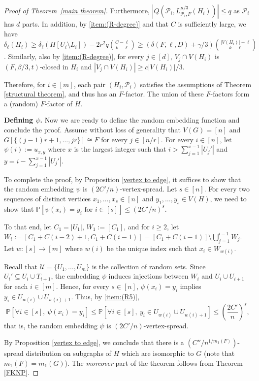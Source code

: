 \documentclass[11pt, letterpaper]{amsart}
\theoremstyle{plain}
\numberwithin{equation}{section}
\theoremstyle{definition}
\newcommand\card[1]{\left| #1 \right|}
\begin{document}
\begin{proof}[Proof of Theorem~\ref{main theorem}]
        Furthermore, $\card{Q(\mathcal{P}_i,L_{\mathcal{P}_i,F}^{\mu/3}(H_i))}\le q$ as $\mathcal P_i$ has $d$ parts. 
        In addition, by \ref{item:(R-degree)} and that $C$ is sufficiently large, we have $\delta_{\ell}(H_i)\ge \delta_{\ell}(H[U_{i}\setminus L_i])-2r^2q\binom{C-\ell}{k-\ell}\ge (\delta(F,\ell,D)+\gamma/3)\binom{\card{V(H_i)}-\ell}{k-\ell} $.
        Similarly, also by \ref{item:(R-degree)}, for every $j\in[d]$, $V_j\cap V(H_i)$ is $(F,\beta/3,t)$-closed in $H_i$ and $\card{V_j\cap V(H_i)}\ge c\card{V(H_i)}/3$. 

        Therefore, for $i\in [m]$, each pair $(H_i, \mathcal P_i)$ satisfies the assumptions of Theorem \ref{structural theorem}, and thus has an $F$-factor.
        The union of these $F$-factors form a (random) $F$-factor of $H$.


        \medskip
        \textbf{Defining $\psi$.} 
        Now we are ready to define the random embedding function and conclude the proof.
        Assume without loss of generality that $V(G)=[n]$ and $G[\{(j-1)r+1,\dots,jr\}]\cong F$ for every $j\in [n/r]$. For every $i\in [n]$, let $\psi(i):=u_{x,y}$ where $x$ is the largest integer such that $i>\sum_{j=1}^{x-1}|U_j'|$ and $y=i-\sum_{j=1}^{x-1}|U_j'|$.

        To complete the proof, by Proposition \ref{vertex to edge}, it suffices to show that the random embedding $\psi$ is $(2C'/n)$-vertex-spread. Let $s\in [n]$. For every two sequences of distinct vertices $x_1,\dots,x_s\in [n]$ and $y_1,\dots,y_s\in V(H)$, we need to show that $\mathbb{P}[\psi(x_i)=y_i\text{ for }i\in[s]]\le {(2C'/n)}^s$.
         
        To that end, let $C_1=|U_1|$, $W_1:=[C_1]$, and for $i\ge2$, let $W_i:=[C_1+C(i-2)+1,C_1+C(i-1)]=[C_1+C(i-1)]\setminus\bigcup_{j=1}^{i-1}W_j$. 
        Let $w:[s]\rightarrow [m]$ where $w(i)$ be the unique index such that $x_i\in W_{w(i)}$. 
         
        Recall that $\mathcal{U}=\{U_1,\dots,U_m\}$ is the collection of random sets. 
        Since $U_{i}'\subseteq U_{i}\cup T_{i+1}$, the embedding $\psi$ induces injections between $W_{i}$ and $U_{i}\cup U_{i+1}$ for each $i\in [m]$. Hence, for every $s\in [n]$, $\psi(x_i)=y_i$ implies $y_i\in U_{w(i)}\cup U_{w(i)+1}$. 
        Thus, by \ref{item:(R5)},
        \[\mathbb{P}\left[\forall i\in[s],~\psi(x_i)=y_i\right]\le \mathbb{P}\left[\forall i\in[s],~y_i\in U_{w(i)}\cup U_{w(i)+1}\right]\le\left(\frac{2C'}{n}\right)^s,
        \]
        that is, the random embedding $\psi$ is $(2C'/n)$-vertex-spread.

        By Proposition \ref{vertex to edge}, we conclude that there is a $(C''/n^{1/m_1(F)})$-spread distribution on subgraphs of $H$ which are isomorphic to $G$ (note that $m_1(F)=m_1(G)$).
        The \emph{moreover} part of the theorem follows from Theorem \ref{FKNP}.
        \end{proof}
\end{document}
